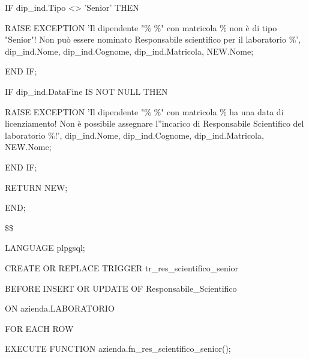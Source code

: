 \begin{flushleft}
\begin{description}
\begin{description}
                        \vspace{0.5cm}

                        \item IF dip\_ind.Tipo <> 'Senior' THEN
                        \begin{description}
                            \item RAISE EXCEPTION 'Il dipendente "\% \%" con matricola \% non è di tipo "Senior"! Non può essere nominato Responsabile scientifico per il laboratorio \%', dip\_ind.Nome, dip\_ind.Cognome, dip\_ind.Matricola, NEW.Nome;
                        \end{description}
                        \item END IF;
                        
                        \vspace{0.5cm}
                        
                        \item IF dip\_ind.DataFine IS NOT NULL THEN
                        \begin{description}
                            \item RAISE EXCEPTION 'Il dipendente "\% \%" con matricola \% ha una data di licenziamento! Non è possibile assegnare l''incarico di Responsabile Scientifico del laboratorio \%!', dip\_ind.Nome, dip\_ind.Cognome, dip\_ind.Matricola, NEW.Nome;
                        \end{description}
                        \item END IF;
                        
                        \vspace{0.5cm}
                    
                        \item RETURN NEW;
                    \end{description}
                    \item END;
                    \item \$\$
                    \item LANGUAGE plpgsql;
                \end{description}
            \end{flushleft}
        \normalfont

        \ttfamily
            \begin{flushleft}
                \begin{description}
                    \item CREATE OR REPLACE TRIGGER tr\_res\_scientifico\_senior
                    \item BEFORE INSERT OR UPDATE OF Responsabile\_Scientifico 
                    \item ON azienda.LABORATORIO
                    \item FOR EACH ROW
                    \item EXECUTE FUNCTION azienda.fn\_res\_scientifico\_senior();
                \end{description}
            \end{flushleft}
        \normalfont

